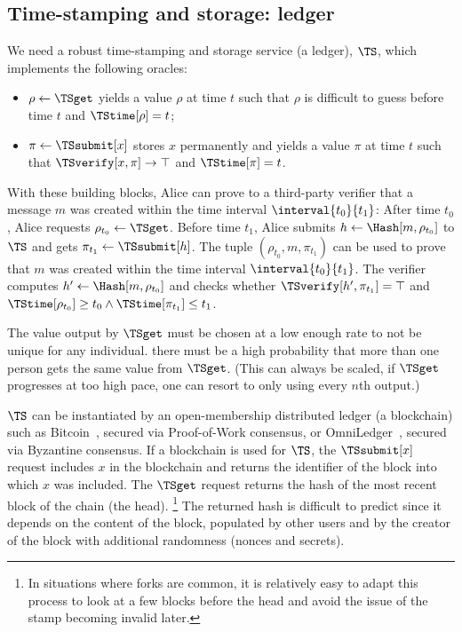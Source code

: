 \subsection{Time-stamping and storage: ledger}%
\label{StorageProperties}\label{timestamp}\label{ledger}

We need a robust time-stamping and storage service (\ie a ledger), \(\TS\), 
which implements the following oracles:
\begin{itemize}
  \item \(\rho \gets \TSget\) yields a value \(\rho\) at time \(t\) such that 
    \(\rho\) is difficult to guess before time \(t\) and \(\TStime[\rho] = t\);
  \item \(\pi\gets \TSsubmit[x]\) stores \(x\) permanently and yields a value 
    \(\pi\) at time \(t\) such that \(\TSverify[x, \pi]\to \top\) and 
    \(\TStime[\pi] = t\).
\end{itemize}

With these building blocks, Alice can prove to a third-party verifier that a 
message \(m\) was created within the time interval \(\interval{t_0}{t_1}\):
After time \(t_0\), Alice requests \(\rho_{t_0}\gets \TSget\).
Before time \(t_1\), Alice submits \(h\gets \Hash[m, \rho_{t_0}]\) to \(\TS\) 
and gets \(\pi_{t_1}\gets \TSsubmit[h]\).
The tuple \((\rho_{t_0}, m, \pi_{t_1})\) can be used to prove that \(m\) was 
created within the time interval \(\interval{t_0}{t_1}\).
The verifier computes \(h'\gets \Hash[m, \rho_{t_0}]\) and checks whether 
\(\TSverify[h', \pi_{t_1}] = \top\) and \(\TStime[\rho_{t_0}] \geq t_0\land 
  \TStime[\pi_{t_1}] \leq t_1\).

The value output by \(\TSget\) must be chosen at a low enough rate to not be 
unique for any individual.
\Ie there must be a high probability that more than one person gets the same 
value from \(\TSget\).
(This can always be scaled, if \(\TSget\) progresses at too high pace, one can 
resort to only using every \(n\)th output.)

\(\TS\) can be instantiated by an open-membership distributed ledger (\eg a blockchain) such as Bitcoin~\cite{Bitcoin}, secured via Proof-of-Work consensus, or OmniLedger~\cite{OmniLedger}, secured via Byzantine consensus.
If a blockchain is used for \(\TS\), the \(\TSsubmit[x]\) request includes 
\(x\) in the blockchain and returns the identifier of the block into which 
\(x\) was included.
The \(\TSget\) request returns the hash of the most recent block of the chain 
(\ie the head).%
\footnote{In situations where forks are common, it is relatively easy to adapt this process to look at a few blocks before the head and avoid the issue of the stamp becoming invalid later.}
The returned hash is difficult to predict since it depends on the content of the block, populated by other users and by the creator of the block with additional randomness (\eg nonces and secrets).

